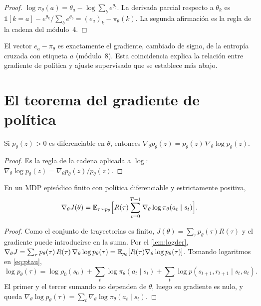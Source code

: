 \begin{proof}
$\log\pi_\theta(a)=\theta_a-\log\sum_b e^{\theta_b}$. La derivada parcial respecto a $\theta_k$ es $\mathbb{1}[k=a]-e^{\theta_k}/\sum_b e^{\theta_b}=(e_a)_k-\pi_\theta(k)$. La segunda afirmación es la regla de la cadena del módulo~4.
\end{proof}

El vector $e_a-\pi_\theta$ es exactamente el gradiente, cambiado de signo, de la entropía cruzada con etiqueta $a$ (módulo~8). Esta coincidencia explica la relación entre gradiente de política y ajuste supervisado que se establece más abajo.

\section{El teorema del gradiente de política}

\begin{lema}\label{lem:logder}
Si $p_\theta(z)>0$ es diferenciable en $\theta$, entonces $\nabla_\theta p_\theta(z)=p_\theta(z)\,\nabla_\theta\log p_\theta(z)$.
\end{lema}

\begin{proof}
Es la regla de la cadena aplicada a $\log$: $\nabla_\theta\log p_\theta(z)=\nabla_\theta p_\theta(z)/p_\theta(z)$.
\end{proof}

\begin{teorema}\label{teo:pg}
En un MDP episódico finito con política diferenciable y estrictamente positiva,
\[
\nabla_\theta J(\theta)=\mathbb{E}_{\tau\sim p_\theta}\Bigl[R(\tau)\sum_{t=0}^{T-1}\nabla_\theta\log\pi_\theta(a_t\mid s_t)\Bigr].
\]
\end{teorema}

\begin{proof}
Como el conjunto de trayectorias es finito, $J(\theta)=\sum_\tau p_\theta(\tau)R(\tau)$ y el gradiente puede introducirse en la suma. Por el \cref{lem:logder},
$\nabla_\theta J=\sum_\tau p_\theta(\tau)\,R(\tau)\,\nabla_\theta\log p_\theta(\tau)=\mathbb{E}_{p_\theta}[R(\tau)\nabla_\theta\log p_\theta(\tau)]$. Tomando logaritmos en \eqref{eq:ptau},
\[
\log p_\theta(\tau)=\log\rho_0(s_0)+\sum_{t}\log\pi_\theta(a_t\mid s_t)+\sum_t\log p(s_{t+1},r_{t+1}\mid s_t,a_t).
\]
El primer y el tercer sumando no dependen de $\theta$, luego su gradiente es nulo, y queda $\nabla_\theta\log p_\theta(\tau)=\sum_t\nabla_\theta\log\pi_\theta(a_t\mid s_t)$.
\end{proof}

